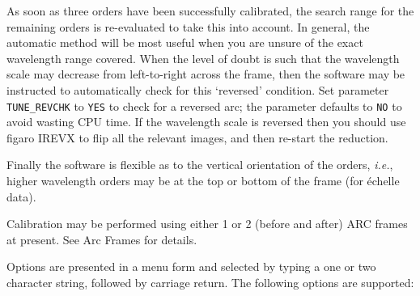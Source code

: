 \documentclass[11pt,twoside]{article}
\makeatletter
\newcommand{\htmlref}[2]{#1}
\newcommand{\xref}[3]{#1}
\newcommand{\sunspec}[2]{#1}
\renewcommand{\sunspec}[2]{#2}
\newcommand{\myindex}[1]{\index{#1}}
\newcommand{\indexcmdname}[1]{\index{#1@\protect\cmdname{#1}}}
\renewcommand{\myindex}[1]{}
\renewcommand{\indexcmdname}[1]{}
\newcommand{\cmdname}{\begingroup \catcode`\_=12 \realcmdname}
\newcommand{\realcmdname}[1]{\endgroup\texttt{#1}}
\makeatother
\begin{document}
As soon as three orders have been successfully calibrated, the search range
for the remaining orders is re-evaluated to take this into account.
In general, the automatic method will be most useful when you are unsure of
the exact wavelength range covered.  When the level of doubt is such that
the wavelength scale may decrease from left-to-right across the frame, then
the software may be instructed to automatically check for this `reversed'
condition.
Set parameter \htmlref{{\tt TUNE\_REVCHK}}{par_TUNE_REVCHK} to \verb+YES+
to check for a reversed arc; the parameter defaults to \verb+NO+ to avoid
wasting CPU time.
If the wavelength scale is reversed then you should use
\xref{{\sc figaro}}{sun86}{}
\xref{IREVX}{sun86}{IREVX} to flip all the relevant images, and then re-start
the reduction.

\myindex{Wavelength scales!reversed}
\indexcmdname{TUNE_REVCHK}
Finally the software is flexible as to the vertical orientation of the
orders, {\it{i.e.}}, higher wavelength orders may be at the top or bottom
of the frame (for \'{e}chelle data).
\myindex{Orientation of frames}
Calibration may be performed using either 1 or 2 (before and after) ARC
frames at present.  See \sunspec{\S\ref{arc_frames}}
{\htmlref{Arc Frames}{arc_frames}} for details.

Options are presented in a menu form and selected by typing a one or two
character string, followed by carriage return.  The following options are
supported:
\end{document}
